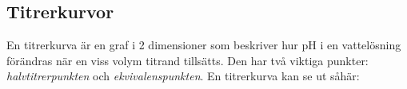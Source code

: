 \subsection{Titrerkurvor}
En titrerkurva är en graf i 2 dimensioner som beskriver hur pH i en vattelösning förändras när en viss volym titrand tillsätts. Den har två viktiga punkter: \emph{halvtitrerpunkten} och \emph{ekvivalenspunkten}. En titrerkurva kan se ut såhär:
\begin{figure*}[h]
    \begin{tikzpicture}
        
    \end{tikzpicture}
\end{figure*}